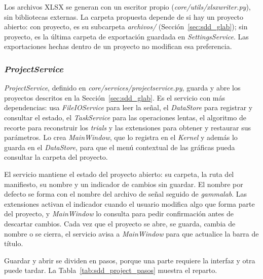\documentclass[12pt,letterpaper,oneside]{article}
\DeclareRobustCommand{\_}{\textunderscore\allowbreak}
\begin{document}
Los archivos XLSX se generan con un escritor propio (\textit{core/utils/xlsx\_writer.py}), sin bibliotecas externas. La carpeta propuesta depende de si hay un proyecto abierto: con proyecto, es su subcarpeta \textit{archivos/} (Sección~\ref{sec:sdd_glab}); sin proyecto, es la última carpeta de exportación guardada en \textit{SettingsService}. Las exportaciones hechas dentro de un proyecto no modifican esa preferencia.

\subsubsection{\textit{ProjectService}}
\label{sec:sdd_project}

\textit{ProjectService}, definido en \textit{core/services/project\_service.py}, guarda y abre los proyectos descritos en la Sección~\ref{sec:sdd_glab}. Es el servicio con más dependencias: usa \textit{FileIOService} para leer la señal, el \textit{DataStore} para registrar y consultar el estado, el \textit{TaskService} para las operaciones lentas, el algoritmo de recorte para reconstruir los \textit{trials} y las extensiones para obtener y restaurar sus parámetros. Lo crea \textit{MainWindow}, que lo registra en el \textit{Kernel} y además lo guarda en el \textit{DataStore}, para que el menú contextual de las gráficas pueda consultar la carpeta del proyecto.

El servicio mantiene el estado del proyecto abierto: su carpeta, la ruta del manifiesto, su nombre y un indicador de cambios sin guardar. El nombre por defecto se forma con el nombre del archivo de señal seguido de \textit{\textunderscore{}gammalab}. Las extensiones activan el indicador cuando el usuario modifica algo que forma parte del proyecto, y \textit{MainWindow} lo consulta para pedir confirmación antes de descartar cambios. Cada vez que el proyecto se abre, se guarda, cambia de nombre o se cierra, el servicio avisa a \textit{MainWindow} para que actualice la barra de título.

Guardar y abrir se dividen en pasos, porque una parte requiere la interfaz y otra puede tardar. La Tabla~\ref{tab:sdd_project_pasos} muestra el reparto.
\end{document}
